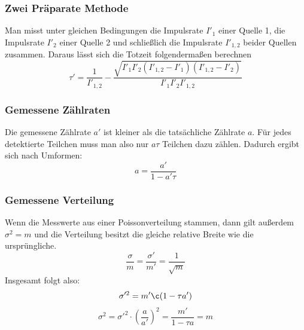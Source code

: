 \documentclass{article}
\begin{document}
	\subsubsection{Zwei Präparate Methode}
	Man misst unter gleichen Bedingungen die Impulsrate $I'_1$ einer Quelle 1, die Impulsrate $I'_2$ einer Quelle 2 und schließlich die Impulsrate $I'_{1,2}$ beider Quellen zusammen. Daraus lässt sich die Totzeit folgendermaßen berechnen\\
	\begin{equation}
	\tau'=\frac{1}{I'_{1,2}}-\frac{\sqrt{I'_1I'_2(I'_{1,2}-I'_1)(I'_{1,2}-I'_2)}}{I'_1I'_2I'_{1,2}}
	\end{equation}
	\subsubsection{Gemessene Zählraten}
	Die gemessene Zählrate $a'$ ist kleiner als die tatsächliche Zählrate $a$. Für jedes detektierte Teilchen muss man also nur $a\tau$ Teilchen dazu zählen. Dadurch ergibt sich nach Umformen:
	\begin{equation}
	a=\frac{a'}{1-a'\tau}
	\end{equation} 
	\subsubsection{Gemessene Verteilung}
	Wenn die Messwerte aus einer Poissonverteilung stammen, dann gilt außerdem $\sigma^2=m$ und die Verteilung besitzt die gleiche relative Breite wie die ursprüngliche.
	\begin{equation}
	\frac{\sigma}{m}=\frac{\sigma'}{m'}=\frac{1}{\sqrt{m}}
	\end{equation}
	Insgesamt folgt also:
	\begin{equation}
	\sigma'^2=m'\c(1-\tau a')
	\end{equation}
	\begin{equation}
	\sigma^2=\sigma'^2\cdot\left(\frac{a}{a'}\right)^2=\frac{m'}{1-\tau a}=m
	\end{equation}
\end{document}
